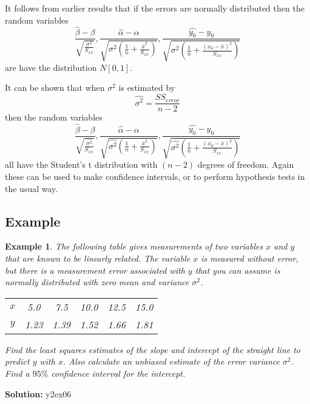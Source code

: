 \documentclass[12pt]{article}
\theoremstyle{break}
\newtheorem{example}[theorem]{Example}
\begin{document}
It follows from earlier results that if the errors are normally distributed then the random variables
$$\frac{\hat{\beta}-\beta}{\sqrt{\frac{\sigma^{2}}{S_{xx}}}}, \frac{\hat{\alpha}-\alpha}{\sqrt{\sigma^{2}\left(\frac{1}{n}+\frac{\bar{x}^{2}}{S_{xx}}\right)}}, \frac{\hat{y_{0}}-y_{0}}{\sqrt{\sigma^{2}\left(\frac{1}{n}+\frac{(x_{0}-\bar{x})^{2}}{S_{xx}}\right)}}$$
are have the distribution $N[0,1].$

It can be shown that when $\sigma^{2}$ is estimated by $$\hat{\sigma^{2}}=\frac{SS_{error}}{n-2}$$ then the random variables
$$\frac{\hat{\beta}-\beta}{\sqrt{\frac{\hat{\sigma^{2}}}{S_{xx}}}}, \frac{\hat{\alpha}-\alpha}{\sqrt{\hat{\sigma^{2}}\left(\frac{1}{n}+\frac{\bar{x}^{2}}{S_{xx}}\right)}}, \frac{\hat{y_{0}}-y_{0}}{\sqrt{\hat{\sigma^{2}}\left(\frac{1}{n}+\frac{(x_{0}-\bar{x})^{2}}{S_{xx}}\right)}}$$
all have the Student's t distribution with $(n-2)$ degrees of freedom. Again these can be used to make confidence intervals, or to perform hypothesis tests in the usual way.

\subsection{Example}
\begin{example}
The following table gives measurements of two variables $x$ and $y$ that are known to be linearly related. The variable $x$ is measured without error, but there is a measurement error associated with $y$ that you can assume is normally distributed with zero mean and variance $\sigma^{2}$.
\begin{center}
\begin{tabular}{|c|c|c|c|c|c|}
  \hline
$x$&	 5.0&	 7.5&	10.0&	12.5&	15.0\\
$y$& 	1.23&	1.39&	1.52&	1.66&	1.81 \\
  \hline
\end{tabular}
\end{center}
Find the least squares estimates of the slope and intercept of the straight line to predict $y$ with $x$. Also calculate an unbiased estimate of the error variance $\sigma^{2}$. Find a $95\%$ confidence interval for the intercept.									
\end{example}

\begin{mdframed}
{\bf Solution:}
\textcolor[rgb]{1.00,1.00,1.00}{y2ex06\lipsum[1-7]}
\end{mdframed}
\end{document}
